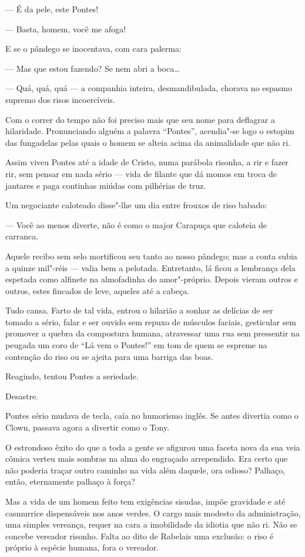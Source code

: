 --- É da pele, este Pontes!

--- Basta, homem, você me afoga!

E se o pândego se inocentava, com cara palerma:

--- Mas que estou fazendo? Se nem abri a boca\ldots{}

--- Quá, quá, quá --- a companhia inteira, desmandibulada, chorava no
espasmo supremo dos risos incoercíveis.

Com o correr do tempo não foi preciso mais que seu nome para deflagrar a
hilaridade. Pronunciando alguém a palavra ``Pontes'', acendia"-se logo o
estopim das fungadelas pelas quais o homem se alteia acima da
animalidade que não ri.

Assim viveu Pontes até a idade de Cristo, numa parábola risonha, a rir e
fazer rir, sem pensar em nada sério --- vida de filante que dá momos em
troca de jantares e paga continhas miúdas com pilhérias de truz.

Um negociante caloteado disse"-lhe um dia entre frouxos de riso babado:

--- Você ao menos diverte, não é como o major Carapuça que caloteia de
carranca.

Aquele recibo sem selo mortificou seu tanto ao nosso pândego; mas a
conta subia a quinze mil"-réis --- valia bem a pelotada. Entretanto, lá
ficou a lembrança dela espetada como alfinete na almofadinha do
amor"-próprio. Depois vieram outros e outros, estes fincados de leve,
aqueles até a cabeça.

Tudo cansa. Farto de tal vida, entrou o hilarião a sonhar as delícias de
ser tomado a sério, falar e ser ouvido sem repuxo de músculos faciais,
gesticular sem promover a quebra da compostura humana, atravessar uma
rua sem pressentir na peugada um coro de ``Lá vem o Pontes!'' em tom de
quem se espreme na contenção do riso ou se ajeita para uma barriga das
boas.

Reagindo, tentou Pontes a seriedade.

Desastre.

Pontes sério mudava de tecla, caía no humorismo inglês. Se antes
divertia como o Clown, passava agora a divertir como o Tony.

O estrondoso êxito do que a toda a gente se afigurou uma faceta nova da
sua veia cômica verteu mais sombras na alma do engraçado arrependido.
Era certo que não poderia traçar outro caminho na vida além daquele, ora
odioso? Palhaço, então, eternamente palhaço à força?

Mas a vida de um homem feito tem exigências sisudas, impõe gravidade e
até casmurrice dispensáveis nos anos verdes. O cargo mais modesto da
administração, uma simples vereança, requer na cara a imobilidade da
idiotia que não ri. Não se concebe vereador risonho. Falta ao dito de
Rabelais uma exclusão: o riso é próprio à espécie humana, fora o
vereador.

